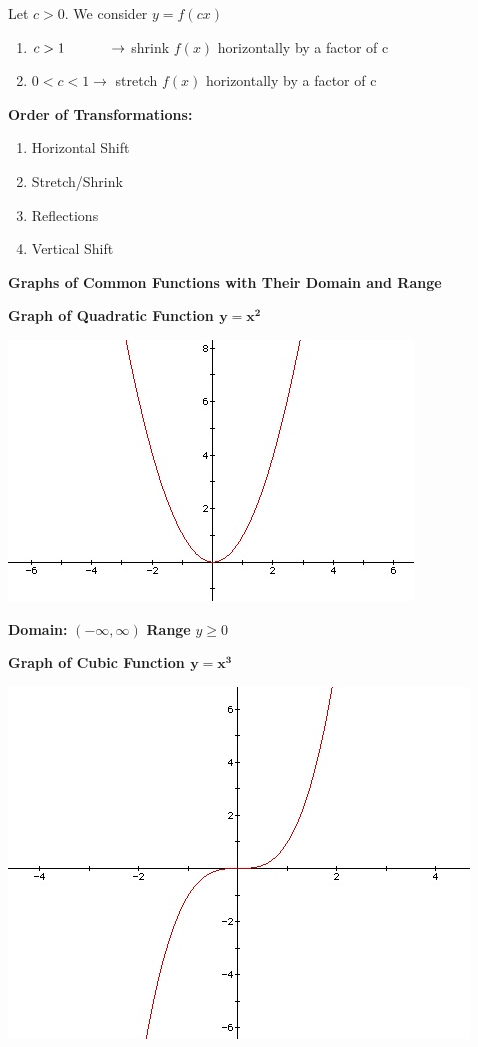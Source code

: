 \documentclass[12pt]{article}
\begin{document}
\centerline{Let $c>0$. We consider $y=f(cx)$}

\begin{enumerate}
\item $c>1 \hspace{1.1cm} \to$ shrink $f(x)$ horizontally by a factor of c
\item $0<c<1 \to$ stretch $f(x)$ horizontally by a factor of c
\end{enumerate}

\newpage

\textbf{Order of Transformations:}

\begin{enumerate}

\item Horizontal Shift 
\item Stretch/Shrink 
\item Reflections
\item Vertical Shift

\end{enumerate}

\textbf{Graphs of Common Functions with Their Domain and Range}

\textbf{Graph of Quadratic Function $\mathbf{y=x^2}$}

\includegraphics{Quadratic.jpg}

\textbf{Domain:} $(-\infty, \infty)$ \hspace{2cm} \textbf{Range} $y \geq 0$

\textbf{Graph of Cubic Function $\mathbf{y=x^3}$}

\includegraphics[scale = 0.9]{CubeFunction.jpg}
\end{document}
